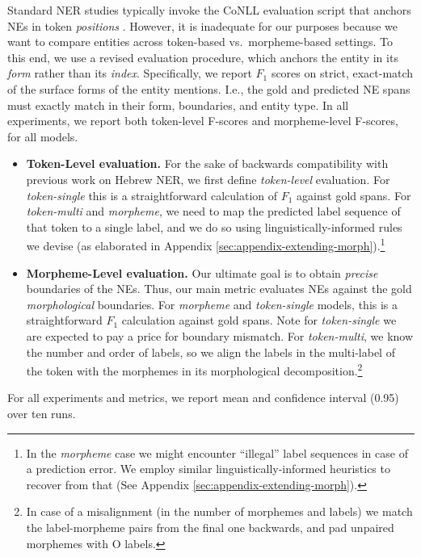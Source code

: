 \documentclass[11pt,a4paper]{article}
\newcommand{\TOKMACRO}{{\em token-single}\xspace}
\newcommand{\MULMACRO}{{\em token-multi}\xspace}
\newcommand{\MORMACRO}{{\em morpheme}\xspace}
\begin{document}
Standard NER studies typically invoke the CoNLL evaluation script that anchors NEs in token {\em positions}  \cite{conll2003}. However, it is inadequate for our purposes because we want to compare entities across token-based vs.\ morpheme-based settings. To this end, we use a  revised evaluation procedure, which anchors the entity in its {\em form} rather than its {\em index}. 
Specifically, we report \(F_1\) scores on strict, exact-match of the surface forms of the entity mentions. I.e.,  the gold and predicted NE spans must exactly match in their form, boundaries, and  entity type. 
In all experiments, we report   both token-level F-scores and morpheme-level F-scores, for all models. 
\begin{itemize}
\item  {\bf Token-Level evaluation.} 
For the sake of backwards compatibility with  previous work on Hebrew NER, we first define {\em token-level}  evaluation. 
    For \TOKMACRO this is a straightforward calculation of \(F_1\)  against gold spans. 
    For \MULMACRO and \MORMACRO, we need to map the predicted label sequence of that token to a single label, and we do so using linguistically-informed rules we devise
    (as elaborated in Appendix \ref{sec:appendix-extending-morph}).\footnote{In the \MORMACRO case we might encounter ``illegal'' label sequences in case of a prediction error.  We employ similar linguistically-informed heuristics to recover from that (See Appendix \ref{sec:appendix-extending-morph}).} 

 
\item {\bf Morpheme-Level evaluation.}
 Our ultimate goal is to obtain {\em precise}   boundaries of the NEs.
 Thus, our main metric evaluates  NEs against the {gold} {\em morphological}  boundaries.  
  For \MORMACRO and \TOKMACRO models, this is a straightforward \(F_1\) calculation against gold spans. Note for  \TOKMACRO we are expected to pay a price for boundary mismatch.
  For \MULMACRO, we  know the number and order of labels, so we align the labels  in the  multi-label of the token with the morphemes in its morphological decomposition.\footnote{In  case of a misalignment  (in the number of morphemes and  labels) we match the label-morpheme pairs from the final one  backwards, and pad unpaired morphemes with O labels.} 
 

\end{itemize}
For all experiments and metrics, we report mean and confidence interval (0.95) over ten runs.
\end{document}
